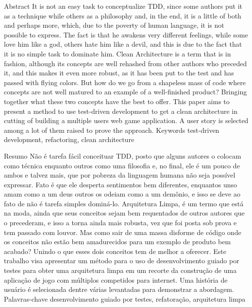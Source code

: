 \begin{singlespace}
  \resumo
    {Abstract}
    {
      It is not an easy task to conceptualize TDD, since some authors put it as a technique while others as a philosophy and, in the end, it is a little of both and perhaps more, which, due to the poverty of human language, it is not possible to express. The fact is that he awakens very different feelings, while some love him like a god, others hate him like a devil, and this is due to the fact that it is no simple task to dominate him.
      Clean Architecture is a term that is in fashion, although its concepts are well rehashed from other authors who preceded it, and this makes it even more robust, as it has been put to the test and has passed with flying colors.
      But how do we go from a shapeless mass of code where concepts are not well matured to an example of a well-finished product? Bringing together what these two concepts have the best to offer.
      This paper aims to present a method to use test-driven development to get a clean architecture in cutting of building a multiple users web game application. A user story is selected among a lot of them raised to prove the approach.
    }
    {Keywords}
    {test-driven development, refactoring, clean architecture}

  \resumo
    {Resumo}
    {
      Não é tarefa fácil conceituar TDD, posto que alguns autores o colocam como técnica enquanto outros como uma filosofia e, no final, ele é um pouco de ambos e talvez mais, que por pobreza da linguagem humana não seja possível expressar. Fato é que ele desperta sentimentos bem diferentes, enquantos unso amam como a um deus outros os odeiam como a um demônio, e isso se deve ao fato de não é tarefa simples dominá-lo.
      Arquitetura Limpa, é um termo que está na moda, ainda que seus conceitos sejam bem requentados de outros autores que o precederam, e isso a torna ainda mais robusta, vez que foi posta sob prova e tem passado com louvor.
      Mas como sair de uma massa disforme de código onde os conceitos não estão bem amadurecidos para um exemplo de produto bem acabado? Unindo o que esses dois conceitos tem de melhor a oferecer.
      Este trabalho visa apresentar um método para o uso de desenvolvimento guiado por testes para obter uma arquitetura limpa em um recorte da construção de uma aplicação de jogo com múltiplos competidos para internet. Uma história de usuário é selecionada dentre várias levantadas para demonstrar a abordagem.
    }
    {Palavras-chave}
    {desenvolvimento guiado por testes, refatoração, arquitetura limpa}
\end{singlespace}
